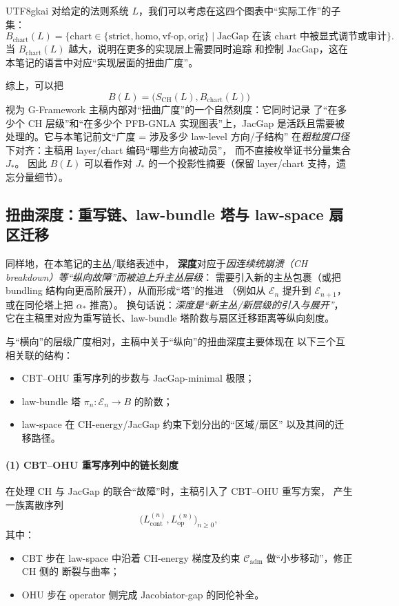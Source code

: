\documentclass[12pt]{article}
\begin{document}
\begin{CJK*}{UTF8}{gkai}
对给定的法则系统 $L$，我们可以考虑在这四个图表中“实际工作”的子集：
\[
  B_{\mathrm{chart}}(L)
  =
  \bigl\{\text{chart}\in
    \{\mathrm{strict},\mathrm{homo},\mathrm{vf\text{-}op},\mathrm{orig}\}
    \mid
    \text{JacGap 在该 chart 中被显式调节或审计}
  \bigr\}.
\]
当 $B_{\mathrm{chart}}(L)$ 越大，说明在更多的实现层上需要同时追踪
和控制 JacGap，这在本笔记的语言中对应“实现层面的扭曲广度”。

综上，可以把
\[
  B(L)
  =
  \bigl(S_{\mathrm{CH}}(L),B_{\mathrm{chart}}(L)\bigr)
\]
视为 G-Framework 主稿内部对“扭曲广度”的一个自然刻度：它同时记录
了“在多少个 CH 层级”和“在多少个 PFB-GNLA 实现图表”上，JacGap
是活跃且需要被处理的。它与本笔记前文“广度 = 涉及多少 law-level 方向/子结构”
在\emph{粗粒度口径}下对齐：主稿用 layer/chart 编码“哪些方向被动员”，
而不直接枚举证书分量集合 $J_\ast$。
因此 $B(L)$ 可以看作对 $J_\ast$ 的一个投影性摘要（保留 layer/chart 支持，遗忘分量细节）。

\subsection{扭曲深度：重写链、law-bundle 塔与 law-space 扇区迁移}

同样地，在本笔记的主丛/联络表述中，
\textbf{深度}对应于\emph{因连续统崩溃（CH breakdown）等“纵向故障”而被迫上升主丛层级}：
需要引入新的主丛包裹（或把 bundling 结构向更高阶展开），从而形成“塔”的推进
（例如从 $\mathcal{E}_n$ 提升到 $\mathcal{E}_{n+1}$，或在同伦塔上把 $\alpha_\ast$ 推高）。
换句话说：\emph{深度是“新主丛/新层级的引入与展开”}，它在主稿里对应为重写链长、law-bundle
塔阶数与扇区迁移距离等纵向刻度。

与“横向”的层级广度相对，主稿中关于“纵向”的扭曲深度主要体现在
以下三个互相关联的结构：
\begin{itemize}
  \item CBT--OHU 重写序列的步数与 JacGap-minimal 极限；
  \item law-bundle 塔 $\pi_n:\mathcal{E}_n\to B$ 的阶数；
  \item law-space 在 CH-energy/JacGap 约束下划分出的“区域/扇区”
        以及其间的迁移路径。
\end{itemize}

\paragraph{(1) CBT--OHU 重写序列中的链长刻度}

在处理 CH 与 JacGap 的联合“故障”时，主稿引入了 CBT--OHU 重写方案，
产生一族离散序列
\[
  \bigl(L_{\mathrm{cont}}^{(n)},L_{\mathrm{op}}^{(n)}\bigr)_{n\ge0},
\]
其中：
\begin{itemize}
  \item CBT 步在 law-space 中沿着 CH-energy 梯度及约束
        $\mathcal{C}_{\mathrm{adm}}$ 做“小步移动”，修正 CH 侧的
        断裂与曲率；
  \item OHU 步在 operator 侧完成 Jacobiator-gap 的同伦补全。
\end{itemize}


\end{CJK*}
\end{document}
